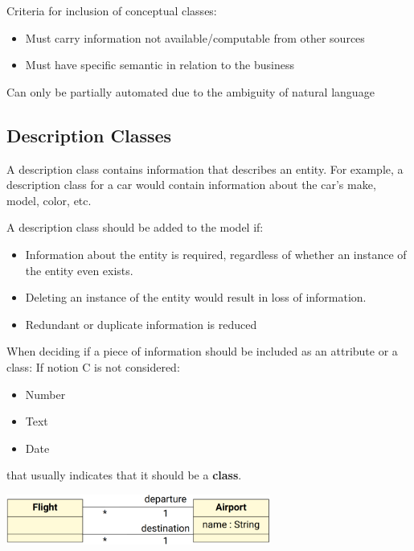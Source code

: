 \documentclass[
../../Software_Engineering_Summary.tex,
]
{subfiles}
\begin{document}
Criteria for inclusion of conceptual classes:
\begin{itemize}
    \item Must carry information not available/computable from other sources
    \item Must have specific semantic in relation to the business
\end{itemize}

Can only be partially automated due to the ambiguity of natural language

\subsection{Description Classes}
A description class contains information that describes an entity. For example, a description class for a car would contain information about the car's make, model, color, etc.

A description class should be added to the model if: 
\begin{itemize}
    \item Information about the entity is required, regardless of whether an instance of the entity even exists.
    \item Deleting an instance of the entity would result in loss of information.
    \item Redundant or duplicate information is reduced
\end{itemize}

\begin{defbox}
    When deciding if a piece of information should be included as an attribute or a class:
    If notion C is not considered:
    \begin{itemize}
        \item Number
        \item Text
        \item Date
    \end{itemize}
    that usually indicates that it should be a \textbf{class}.
    \begin{center}
        \includegraphics[width=0.65\textwidth]{Pics/ClassVsAttributeExample.png}
    \end{center}
\end{defbox}
\end{document}
